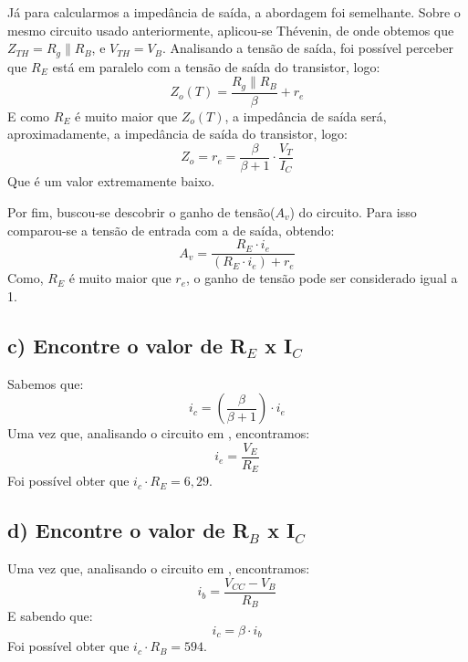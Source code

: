 \documentclass{article}
\begin{document}
            Já para calcularmos a impedância de saída, a abordagem foi semelhante. Sobre o mesmo circuito usado anteriormente, aplicou-se Thévenin, de onde obtemos que $Z_{TH} = R_g \parallel R_B$, e $V_{TH} = V_B$. Analisando a tensão de saída, foi possível perceber que $R_E$ está em paralelo com a tensão de saída do transistor, logo:
            \begin{equation}
                Z_{o}(T) = \frac{R_g \parallel R_B}{\beta} + r_e
            \end{equation}
            E como $R_E$ é muito maior que $Z_{o}(T)$, a impedância de saída será, aproximadamente, a impedância de saída do transistor, logo:
            \begin{equation}
                Z_o = r_e = \frac{\beta}{\beta + 1} \cdot \frac{V_T}{I_C}
            \end{equation}
            Que é um valor extremamente baixo.
            
            Por fim, buscou-se descobrir o ganho de tensão($A_v$) do circuito. Para isso comparou-se a tensão de entrada com a de saída, obtendo:
            \begin{equation}
                A_v = \frac{R_E \cdot i_e}{(R_E \cdot i_e) + r_e}
            \end{equation}
            Como, $R_E$ é muito maior que $r_e$, o ganho de tensão pode ser considerado igual a 1.
            
         \subsection{c) Encontre o valor de R$_E$ x I$_C$}
            Sabemos que:
            \begin{equation}
                i_c = (\frac{\beta}{\beta + 1}) \cdot i_e
            \end{equation}
            Uma vez que, analisando o circuito em \cite{ref:roteiro}, encontramos:
            \begin{equation}
                i_e = \frac{V_E}{R_E}
            \end{equation}
            Foi possível obter que $i_c \cdot R_E = 6,29$.
            
         \subsection{d) Encontre o valor de R$_B$ x I$_C$}
            Uma vez que, analisando o circuito em \cite{ref:roteiro}, encontramos:
            \begin{equation}
                i_b = \frac{V_{CC} - V_B}{R_B}
            \end{equation}
            E sabendo que:
            \begin{equation}
                i_c = \beta \cdot i_b
            \end{equation}
            Foi possível obter que $i_c \cdot R_B = 594$.
            
\end{document}
